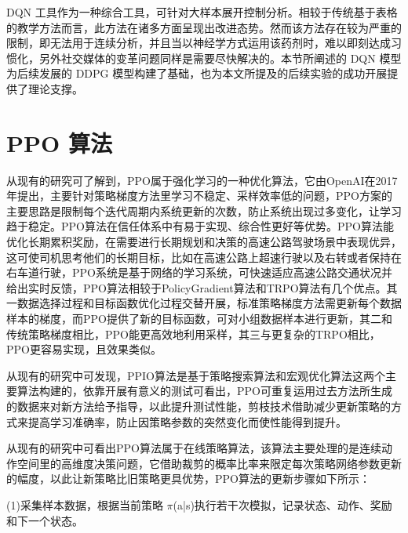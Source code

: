 DQN 工具作为一种综合工具，可针对大样本展开控制分析。相较于传统基于表格的教学方法而言，此方法在诸多方面呈现出改进态势。然而该方法存在较为严重的限制，即无法用于连续分析，并且当以神经学方式运用该药剂时，难以即刻达成习惯化，另外社交媒体的变革问题同样是需要尽快解决的。本节所阐述的 DQN 模型为后续发展的 DDPG 模型构建了基础，也为本文所提及的后续实验的成功开展提供了理论支撑。

\section{PPO 算法}


从现有的研究可了解到，PPO属于强化学习的一种优化算法，它由OpenAI在2017年提出，主要针对策略梯度方法里学习不稳定、采样效率低的问题，PPO方案的主要思路是限制每个迭代周期内系统更新的次数，防止系统出现过多变化，让学习趋于稳定。PPO算法在信任体系中有易于实现、综合性更好等优势。PPO算法能优化长期累积奖励，在需要进行长期规划和决策的高速公路驾驶场景中表现优异，这可使司机思考他们的长期目标，比如在高速公路上超速行驶以及右转或者保持在右车道行驶，PPO系统是基于网络的学习系统，可快速适应高速公路交通状况并给出实时反馈，PPO算法相较于PolicyGradient算法和TRPO算法有几个优点。其一数据选择过程和目标函数优化过程交替开展，标准策略梯度方法需更新每个数据样本的梯度，而PPO提供了新的目标函数，可对小组数据样本进行更新，其二和传统策略梯度相比，PPO能更高效地利用采样，其三与更复杂的TRPO相比，PPO更容易实现，且效果类似\cite{dey2017gate}。

从现有的研究中可发现，PPIO算法是基于策略搜索算法和宏观优化算法这两个主要算法构建的，依靠开展有意义的测试可看出，PPO可重复运用过去方法所生成的数据来对新方法给予指导，以此提升测试性能，剪枝技术借助减少更新策略的方式来提高学习准确率，防止因策略参数的突然变化而使性能得到提升。


从现有的研究中可看出PPO算法属于在线策略算法，该算法主要处理的是连续动作空间里的高维度决策问题，它借助裁剪的概率比率来限定每次策略网络参数更新的幅度，以此让新策略比旧策略更具优势，PPO算法的更新步骤如下所示\cite{JSJJ20250416003}：

(1)采集样本数据，根据当前策略 $\pi$(a|s)执行若干次模拟，记录状态、动作、奖励和下一个状态。

